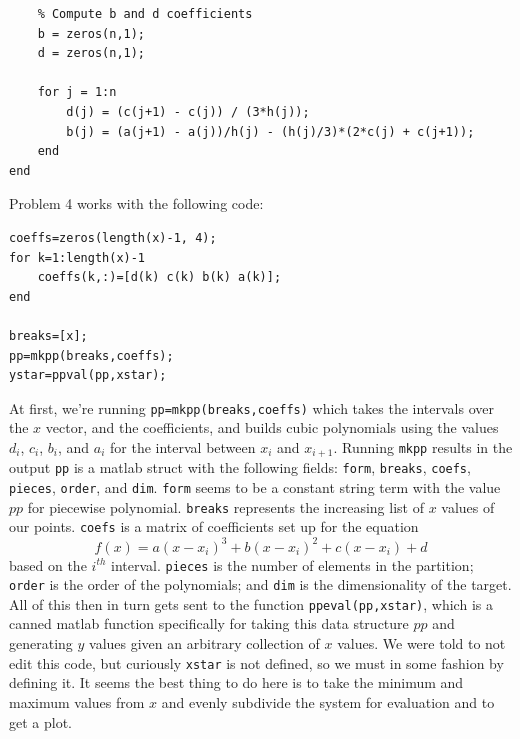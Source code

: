 \documentclass[12pt]{amsart}
\begin{document}
\begin{onehalfspace}
\begin{tiny}
\begin{verbatim}
    % Compute b and d coefficients
    b = zeros(n,1);
    d = zeros(n,1);

    for j = 1:n
        d(j) = (c(j+1) - c(j)) / (3*h(j));
        b(j) = (a(j+1) - a(j))/h(j) - (h(j)/3)*(2*c(j) + c(j+1));
    end
end
        \end{verbatim}
        \end{tiny}

        Problem 4 works with the following code:

        \begin{tiny}
        \begin{verbatim}
coeffs=zeros(length(x)-1, 4);
for k=1:length(x)-1
    coeffs(k,:)=[d(k) c(k) b(k) a(k)];
end

breaks=[x];
pp=mkpp(breaks,coeffs);
ystar=ppval(pp,xstar);
        \end{verbatim}
        \end{tiny}

        At first, we're running \texttt{pp=mkpp(breaks,coeffs)} which takes the intervals over the $x$ vector, and the
        coefficients, and builds cubic polynomials using the values $d_i$, $c_i$, $b_i$, and $a_i$ for the interval between
        $x_i$ and $x_{i+1}$.
        Running \texttt{mkpp} results in the output \texttt{pp} is a matlab struct with the following fields:
        \texttt{form}, \texttt{breaks}, \texttt{coefs}, \texttt{pieces}, \texttt{order}, and \texttt{dim}.
        \texttt{form} seems to be a constant string term with the value $pp$ for piecewise polynomial.
        \texttt{breaks} represents the increasing list of $x$ values of our points.
        \texttt{coefs} is a matrix of coefficients set up for the equation
        \begin{displaymath}
            f(x) = a(x-x_i)^3 + b(x-x_i)^2 + c(x-x_i) + d
        \end{displaymath}
        based on the $i^{th}$ interval.
        \texttt{pieces} is the number of elements in the partition; \texttt{order} is the order of the polynomials; and
        \texttt{dim} is the dimensionality of the target.
        All of this then in turn gets sent to the function \texttt{ppeval(pp,xstar)}, which is a canned matlab function
        specifically for taking this data structure $pp$ and generating $y$ values given an arbitrary collection of $x$
        values.
        We were told to not edit this code, but curiously \texttt{xstar} is not defined, so we must in some fashion by
        defining it.
        It seems the best thing to do here is to take the minimum and maximum values from $x$ and evenly subdivide the
        system for evaluation and to get a plot.


\end{onehalfspace}
\end{document}
